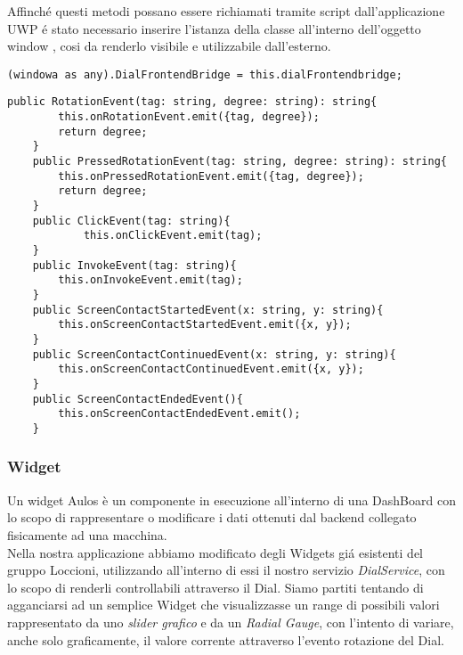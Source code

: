 Affinché questi metodi possano essere richiamati tramite script dall'applicazione UWP é stato necessario inserire l'istanza della classe all'interno dell'oggetto window \cite{win}, cosi da renderlo visibile e utilizzabile dall'esterno.\\

\vspace{1.0cm}
\begin{lstlisting}[caption={Inserimento DialFrontendbridge in window },style=javaScriptCode]
(windowa as any).DialFrontendBridge = this.dialFrontendbridge;
\end{lstlisting} 
\vspace{1.0cm}

\newpage
\vspace{1.0cm}
\begin{lstlisting}[caption={Metodi esposti DialFrontendBridge},style=javaScriptCode]
    public RotationEvent(tag: string, degree: string): string{
        this.onRotationEvent.emit({tag, degree});
        return degree;
    }
    public PressedRotationEvent(tag: string, degree: string): string{
        this.onPressedRotationEvent.emit({tag, degree});
        return degree;
    }
    public ClickEvent(tag: string){
            this.onClickEvent.emit(tag);
    }
    public InvokeEvent(tag: string){
        this.onInvokeEvent.emit(tag);
    }
    public ScreenContactStartedEvent(x: string, y: string){
        this.onScreenContactStartedEvent.emit({x, y});
    }
    public ScreenContactContinuedEvent(x: string, y: string){
        this.onScreenContactContinuedEvent.emit({x, y});
    }
    public ScreenContactEndedEvent(){
        this.onScreenContactEndedEvent.emit();
    }
\end{lstlisting} 

\subsubsection{Widget}

Un widget Aulos è un componente in esecuzione all’interno di una DashBoard con lo scopo di rappresentare o modificare i dati ottenuti dal backend collegato fisicamente ad una macchina.\\

Nella nostra applicazione abbiamo modificato degli Widgets giá esistenti del gruppo Loccioni, utilizzando all'interno di essi il nostro servizio \emph{DialService}, con lo scopo di renderli controllabili attraverso il Dial. Siamo partiti tentando di agganciarsi ad un semplice Widget che visualizzasse un range di possibili valori rappresentato da uno \emph{slider grafico} e da un \emph{Radial Gauge}, con l'intento di variare, anche solo graficamente, il valore corrente attraverso l'evento rotazione del Dial.\\

